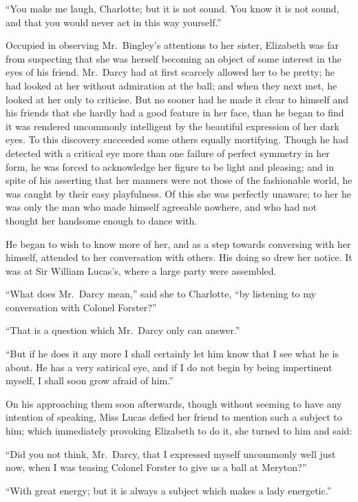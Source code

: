 ``You make me laugh, Charlotte; but it is not sound.  You know
it is not sound, and that you would never act in this way
yourself.''

Occupied in observing Mr.\ Bingley's attentions to her sister,
Elizabeth was far from suspecting that she was herself becoming
an object of some interest in the eyes of his friend.  Mr.\ Darcy
had at first scarcely allowed her to be pretty; he had looked at
her without admiration at the ball; and when they next met, he
looked at her only to criticise.  But no sooner had he made it
clear to himself and his friends that she hardly had a good feature
in her face, than he began to find it was rendered uncommonly
intelligent by the beautiful expression of her dark eyes.  To this
discovery succeeded some others equally mortifying.  Though he
had detected with a critical eye more than one failure of perfect
symmetry in her form, he was forced to acknowledge her figure
to be light and pleasing; and in spite of his asserting that her
manners were not those of the fashionable world, he was caught
by their easy playfulness.  Of this she was perfectly unaware;
to her he was only the man who made himself agreeable nowhere,
and who had not thought her handsome enough to dance with.

He began to wish to know more of her, and as a step towards
conversing with her himself, attended to her conversation with
others.  His doing so drew her notice.  It was at Sir William
Lucas's, where a large party were assembled.

``What does Mr.\ Darcy mean,'' said she to Charlotte, ``by
listening to my conversation with Colonel Forster?''

``That is a question which Mr.\ Darcy only can answer.''

``But if he does it any more I shall certainly let him know that I
see what he is about.  He has a very satirical eye, and if I do not
begin by being impertinent myself, I shall soon grow afraid of
him.''

On his approaching them soon afterwards, though without
seeming to have any intention of speaking, Miss Lucas defied
her friend to mention such a subject to him; which immediately
provoking Elizabeth to do it, she turned to him and said:

``Did you not think, Mr.\ Darcy, that I expressed myself
uncommonly well just now, when I was teasing Colonel Forster
to give us a ball at Meryton?''

``With great energy; but it is always a subject which makes a lady
energetic.''


